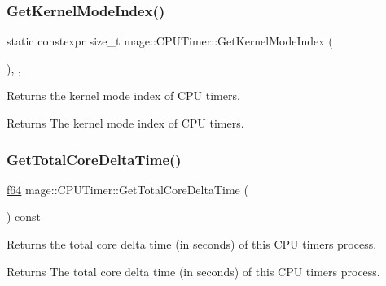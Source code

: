 \subsubsection{\texorpdfstring{Get\+Kernel\+Mode\+Index()}{GetKernelModeIndex()}}
{\footnotesize\ttfamily static constexpr size\+\_\+t mage\+::\+C\+P\+U\+Timer\+::\+Get\+Kernel\+Mode\+Index (\begin{DoxyParamCaption}{ }\end{DoxyParamCaption})\hspace{0.3cm}{\ttfamily [static]}, {\ttfamily [private]}, {\ttfamily [noexcept]}}

Returns the kernel mode index of C\+PU timers.

\begin{DoxyReturn}{Returns}
The kernel mode index of C\+PU timers. 
\end{DoxyReturn}
\hypertarget{classmage_1_1_c_p_u_timer_a2c2f4c9dc98036a4a69f96e91dbb8b5e}{}\label{classmage_1_1_c_p_u_timer_a2c2f4c9dc98036a4a69f96e91dbb8b5e} 
\subsubsection{\texorpdfstring{Get\+Total\+Core\+Delta\+Time()}{GetTotalCoreDeltaTime()}}
{\footnotesize\ttfamily \hyperlink{namespacemage_ab935747c6941320bd6214b5a5f265b09}{f64} mage\+::\+C\+P\+U\+Timer\+::\+Get\+Total\+Core\+Delta\+Time (\begin{DoxyParamCaption}{ }\end{DoxyParamCaption}) const\hspace{0.3cm}{\ttfamily [noexcept]}}

Returns the total core delta time (in seconds) of this C\+PU timer\textquotesingle{}s process.

\begin{DoxyReturn}{Returns}
The total core delta time (in seconds) of this C\+PU timer\textquotesingle{}s process. 
\end{DoxyReturn}
\hypertarget{classmage_1_1_c_p_u_timer_a38a95a2071856a92d75b1a588e7f8380}{}\label{classmage_1_1_c_p_u_timer_a38a95a2071856a92d75b1a588e7f8380} 
